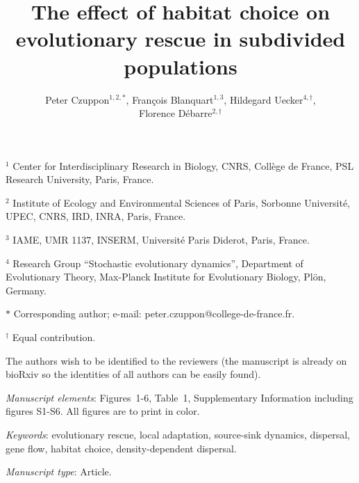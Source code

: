 \documentclass[11pt]{article}
\title{The effect of habitat choice on evolutionary rescue in subdivided populations}
\author{Peter Czuppon$^{1,2,\ast}$, Fran\c{c}ois Blanquart$^{1,3}$, Hildegard Uecker$^{4,\dag}$,\\ Florence D\'{e}barre$^{2,\dag}$}
\date{}
\begin{document}
\doparttoc %
\faketableofcontents %

\renewcommand \thepart{}
\renewcommand \partname{}



\maketitle

\vspace{-20pt}
\noindent $^1$ Center for Interdisciplinary Research in Biology, CNRS, Coll\`ege de France, PSL Research University, Paris, France.

\noindent $^2$ Institute of Ecology and Environmental Sciences of Paris, Sorbonne Universit\'e, UPEC, CNRS, IRD, INRA, Paris, France.

\noindent $^3$ IAME, UMR 1137, INSERM, Universit\'{e} Paris Diderot, Paris, France.

\noindent $^4$ Research Group ``Stochastic evolutionary dynamics'', Department of Evolutionary Theory, Max-Planck Institute for Evolutionary Biology, Pl\"{o}n, Germany.

\noindent $\ast$ Corresponding author; e-mail: peter.czuppon@college-de-france.fr.

\noindent $^\dag$ Equal contribution.

\noindent The authors wish to be identified to the reviewers (the manuscript is already on bioRxiv so the identities of all authors can be easily found).

\bigskip

\textit{Manuscript elements}: Figures~1-6, Table~1, Supplementary Information including figures S1-S6. All figures are to print in color.

\bigskip

\textit{Keywords}: evolutionary rescue, local adaptation, source-sink dynamics, dispersal, gene flow, habitat choice, density-dependent dispersal.

\bigskip

\textit{Manuscript type}: Article. %
\end{document}
